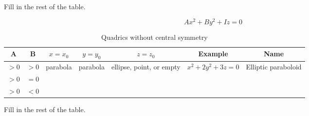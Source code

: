 Fill in the rest of the table.

\bigskip


\begin{equation*}
Ax^2+By^2+Iz=0
\end{equation*}

\begin{table}
\begin{tabular}{|c|c|c|c|c|c|c|}
  \hline
  A & B  & $x=x_0$ & $y=y_0$ & $z=z_0$ & Example & Name
  \\
  \hline
  $>0$ & $>0$   & parabola & parabola & ellipse, point, or empty & $x^2+2y^2+3z=0$ & Elliptic paraboloid \\
  \hline
  $>0$ & $=0$ & &  &  &  &   \\
  \hline
  $>0$ & $<0$ &  &  &  &  &   \\
  \hline
\end{tabular}
  \caption{Quadrics without central symmetry}
\end{table}
\bigskip

Fill in the rest of the table.